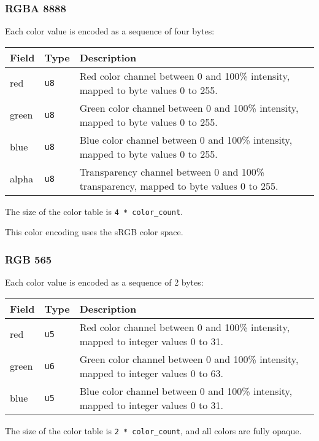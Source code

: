 \documentclass[]{article}
\begin{document}
\hypertarget{rgba-8888}{\subsubsection{RGBA 8888}\label{rgba-8888}}

Each color value is encoded as a sequence of four bytes:

\begin{longtable}[]{@{}p{0.5in}p{0.5in}p{5.0in}@{}}
\toprule
Field & Type & Description \\
\midrule
\endhead
red & \texttt{u8} & Red color channel between 0 and 100\% intensity, mapped to byte values 0 to 255. \\
green & \texttt{u8} & Green color channel between 0 and 100\% intensity, mapped to byte values 0 to 255. \\
blue & \texttt{u8} & Blue color channel between 0 and 100\% intensity, mapped to byte values 0 to 255. \\
alpha & \texttt{u8} & Transparency channel between 0 and 100\% transparency, mapped to byte values 0 to 255. \\
\bottomrule
\end{longtable}

The size of the color table is \texttt{4\ *\ color\_count}.

This color encoding uses the sRGB color space.

\hypertarget{rgb-565}{\subsubsection{RGB 565}\label{rgb-565}}

Each color value is encoded as a sequence of 2 bytes:

\begin{longtable}[]{@{}p{0.5in}p{0.5in}p{5.0in}@{}}
\toprule
Field & Type & Description \\
\midrule
\endhead
red & \texttt{u5} & Red color channel between 0 and 100\% intensity, mapped to integer values 0 to 31. \\
green & \texttt{u6} & Green color channel between 0 and 100\% intensity, mapped to integer values 0 to 63. \\
blue & \texttt{u5} & Blue color channel between 0 and 100\% intensity, mapped to integer values 0 to 31. \\
\bottomrule
\end{longtable}

The size of the color table is \texttt{2\ *\ color\_count}, and all
colors are fully opaque.
\end{document}

